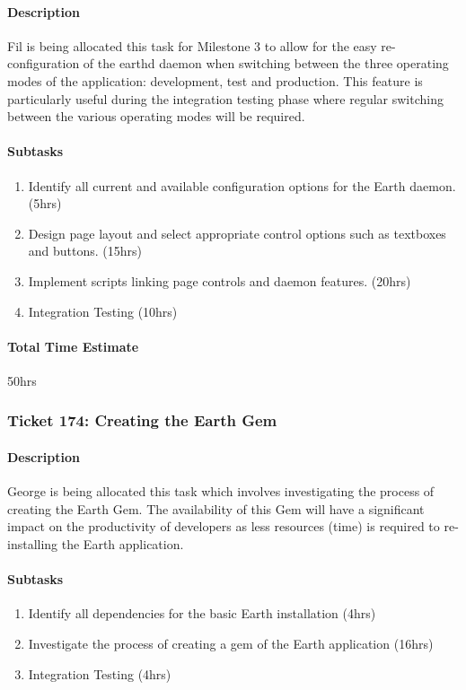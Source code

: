 \documentclass[10pt,a4,oneside]{article}
\begin{document}
\paragraph{Description}
Fil is being allocated this task for Milestone 3 to allow for the 
easy re-configuration of the earthd daemon when switching between 
the three operating modes of the application: development, test 
and production. This feature is particularly useful during the 
integration testing phase where regular switching between the 
various operating modes will be required.

\paragraph{Subtasks}
\noindent
\begin{enumerate}
\item Identify all current and available configuration options for the Earth daemon. (5hrs)
\item Design page layout and select appropriate control options such as textboxes and buttons. (15hrs)
\item Implement scripts linking page controls and daemon features. (20hrs)
\item Integration Testing (10hrs)
\end{enumerate}

\paragraph{Total Time Estimate} 50hrs
 

\subsubsection{Ticket 174: Creating the Earth Gem}

\paragraph{Description}
George is being allocated this task which involves investigating 
the process of creating the Earth Gem. The availability of this 
Gem will have a significant impact on the productivity of developers 
as less resources (time) is required to re-installing the Earth
application.

\paragraph{Subtasks}
\noindent
\begin{enumerate}
\item Identify all dependencies for the basic Earth installation (4hrs)
\item Investigate the process of creating a gem of the Earth application (16hrs)
\item Integration Testing (4hrs)
\end{enumerate}
\end{document}
